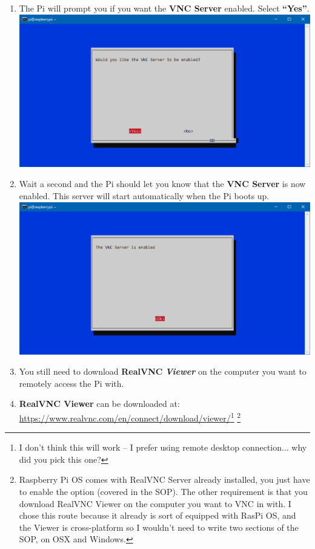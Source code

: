 \documentclass{article}
\begin{document}
\begin{enumerate}
  \item The Pi will prompt you if you want the \textbf{VNC Server} enabled. Select \textbf{``Yes''}.
  \newline
  \newline
  \includegraphics[width=1.00\textwidth]{rcvncenable}
  \item Wait a second and the Pi should let you know that the \textbf{VNC Server} is now enabled. This server will start automatically when the Pi boots up.
  \newline
  \newline
  \includegraphics[width=1.00\textwidth]{rcvncconf}
  \item You still need to download \textbf{RealVNC} \textbf{\textit{Viewer}} on the computer you want to remotely access the Pi with.
  \item \textbf{RealVNC Viewer} can be downloaded at:
  \newline
  \url{https://www.realvnc.com/en/connect/download/viewer/}\footnote{I don't think this will work -- I prefer using remote desktop connection... why did you pick this one?} \footnote{Raspberry Pi OS comes with RealVNC Server already installed, you just have to enable the option (covered in the SOP). The other requirement is that you download RealVNC Viewer on the computer you want to VNC in with. I chose this route because it already is sort of equipped with RasPi OS, and the Viewer is cross-platform so I wouldn't need to write two sections of the SOP, on OSX and Windows.}

\end{enumerate}
\end{document}

